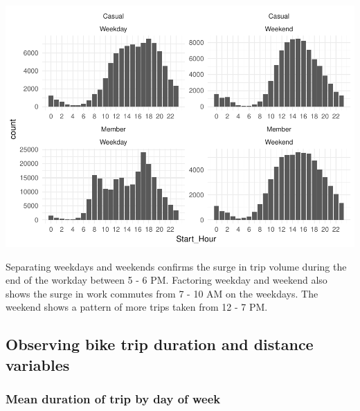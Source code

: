 \documentclass[]{article}
\newenvironment{Shaded}{\begin{snugshade}}{\end{snugshade}}
\newcommand{\KeywordTok}[1]{\textcolor[rgb]{0.13,0.29,0.53}{\textbf{#1}}}
\newcommand{\DataTypeTok}[1]{\textcolor[rgb]{0.13,0.29,0.53}{#1}}
\newcommand{\DecValTok}[1]{\textcolor[rgb]{0.00,0.00,0.81}{#1}}
\newcommand{\StringTok}[1]{\textcolor[rgb]{0.31,0.60,0.02}{#1}}
\newcommand{\OperatorTok}[1]{\textcolor[rgb]{0.81,0.36,0.00}{\textbf{#1}}}
\newcommand{\NormalTok}[1]{#1}
\begin{document}
\begin{Shaded}
\end{Shaded}

\includegraphics{Nice_Ride_Project_Stat_ReportDRAFT_files/figure-latex/unnamed-chunk-6-1.pdf}

Separating weekdays and weekends confirms the surge in trip volume
during the end of the workday between 5 - 6 PM. Factoring weekday and
weekend also shows the surge in work commutes from 7 - 10 AM on the
weekdays. The weekend shows a pattern of more trips taken from 12 - 7
PM.

\subsection{Observing bike trip duration and distance
variables}\label{observing-bike-trip-duration-and-distance-variables}

\subsubsection{Mean duration of trip by day of
week}\label{mean-duration-of-trip-by-day-of-week}
\end{document}
